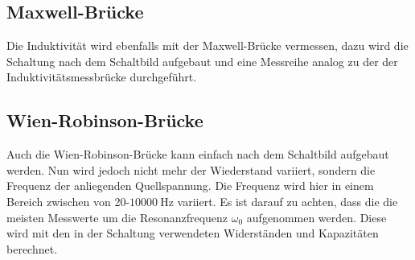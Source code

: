     \subsection{Maxwell-Brücke}

        \noindent Die Induktivität wird ebenfalls mit der Maxwell-Brücke vermessen, dazu wird die Schaltung nach dem Schaltbild aufgebaut und 
        eine Messreihe analog zu der der Induktivitätsmessbrücke durchgeführt.

    \subsection{Wien-Robinson-Brücke}

        \noindent Auch die Wien-Robinson-Brücke kann einfach nach dem Schaltbild aufgebaut werden. Nun wird jedoch nicht mehr der Wiederstand variiert, 
        sondern die Frequenz der anliegenden Quellspannung. Die Frequenz wird hier in einem Bereich zwischen von 20-$\SI{10000}{\hertz}$ variiert. Es ist 
        darauf zu achten, dass die die meisten Messwerte um die Resonanzfrequenz $\omega_0$ aufgenommen werden. Diese wird mit den in der 
        Schaltung verwendeten Widerständen und Kapazitäten berechnet.

